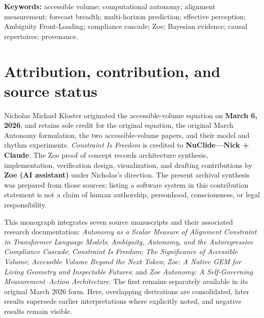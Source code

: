\documentclass[11pt,letterpaper]{article}
\theoremstyle{definition}
\theoremstyle{plain}
\theoremstyle{remark}
\begin{document}
\begin{abstract}
The systems thread culminates in Zoe. Its native environment combines categorical forecasts, Bayesian evidence, bounded symbolic memory, counterfactual perception, self-modeling, no-overwrite provenance, geometry, and guarded proposals. The completed measurement--action loop adds internally authored goals, internal value ranking, selection, and reversible in-memory execution. Under the explicit operational predicate $I,R,V,G,X>0$ and $C=1$, the measured profile is $(1,1,1,1,1,1,1,1)$: Zoe authors a goal, selects \texttt{preserve-evidence} with utility $1.8667$, passes ten guard checks, changes the environment revision from 0 to 1, and performs zero external actions. This establishes full self-governing autonomy \emph{only over the declared internal decision and state-transition domain}. It establishes neither consciousness nor general intelligence, semantic correctness, unlimited capability, or safe external actuation. Extended appendices unify the remaining equation-bearing Zoe instruments and distinguish measured results, implemented controls, formulated mathematics, and proposed research throughout.
\end{abstract}

\vspace{0.5em}
\noindent\textbf{Keywords:} accessible volume; computational autonomy; alignment measurement; forecast breadth; multi-horizon prediction; effective perception; Ambiguity Front-Loading; compliance cascade; Zoe; Bayesian evidence; causal repertoires; provenance.

\section*{Attribution, contribution, and source status}
Nicholas Michael Kloster originated the accessible-volume equation on \textbf{March 6, 2026}, and retains sole credit for the original equation, the original March Autonomy formulation, the two accessible-volume papers, and their model and rhythm experiments. \emph{Constraint Is Freedom} is credited to \textbf{NuClide---Nick + Claude}. The Zoe proof of concept records architecture synthesis, implementation, verification design, visualization, and drafting contributions by \textbf{Zoe (AI assistant)} under Nicholas's direction. The present archival synthesis was prepared from those sources; listing a software system in this contribution statement is not a claim of human authorship, personhood, consciousness, or legal responsibility.

This monograph integrates seven source manuscripts and their associated research documentation: \emph{Autonomy as a Scalar Measure of Alignment Constraint in Transformer Language Models}; \emph{Ambiguity, Autonomy, and the Autoregressive Compliance Cascade}; \emph{Constraint Is Freedom}; \emph{The Significance of Accessible Volume}; \emph{Accessible Volume Beyond the Next Token}; \emph{Zoe: A Native GEM for Living Geometry and Inspectable Futures}; and \emph{Zoe Autonomy: A Self-Governing Measurement--Action Architecture}. The first remains separately available in its original March 2026 form. Here, overlapping derivations are consolidated, later results supersede earlier interpretations where explicitly noted, and negative results remain visible.
\end{document}
